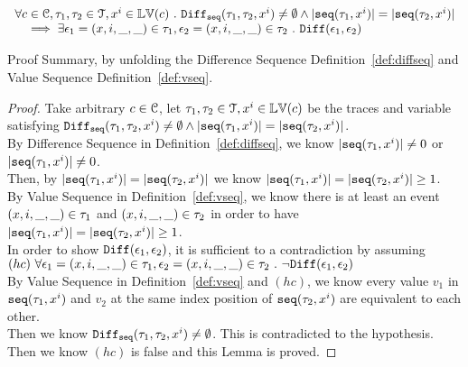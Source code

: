 %
\begin{lem}
	\label{lem:diffval_inv}
\[
	\begin{array}{l}
	\forall c \in \mathcal{C}, \mathtt{\tau}_1, \mathtt{\tau}_2 \in \mathcal{T}, x^i \in \mathbb{LV}(c) ~.~ 
	\mathtt{Diff}_{\mathtt{seq}}(\mathtt{\tau}_1, \mathtt{\tau}_2, x^i) \neq \emptyset \land |\mathtt{seq}(\mathtt{\tau}_1, x^i)| = |\mathtt{seq}(\mathtt{\tau}_2, x^i)|
	\\ \quad \implies
	\exists \mathtt{\epsilon}_1 = (x, i, \_, \_) \in \mathtt{\tau}_1, \mathtt{\epsilon}_2 = (x, i, \_, \_) \in \mathtt{\tau}_2 ~.~ \mathtt{Diff}(\mathtt{\epsilon}_1, \mathtt{\epsilon}_2)
\end{array}
\]
\end{lem}
Proof Summary, by unfolding the Difference Sequence Definition~\ref{def:diffseq} and Value Sequence Definition~\ref{def:vseq}.
\begin{proof}
	Take arbitrary $c \in \mathcal{C}$,
%
let $\mathtt{\tau}_1, \mathtt{\tau}_2 \in \mathcal{T}, x^i\in \mathbb{LV}(c)$ 
be the traces and variable satisfying 
$\mathtt{Diff}_{\mathtt{seq}}(\mathtt{\tau}_1, \mathtt{\tau}_2, x^i) \neq \emptyset \land |\mathtt{seq}(\mathtt{\tau}_1, x^i)| = |\mathtt{seq}(\mathtt{\tau}_2, x^i)|$.
\\
By Difference Sequence in Definition~\ref{def:diffseq}, we know $|\mathtt{seq}(\mathtt{\tau}_1, x^i)| \neq 0$ or $|\mathtt{seq}(\mathtt{\tau}_1, x^i)| \neq 0$.
\\
Then, by $|\mathtt{seq}(\mathtt{\tau}_1, x^i)| = |\mathtt{seq}(\mathtt{\tau}_2, x^i)|$ we know $|\mathtt{seq}(\mathtt{\tau}_1, x^i)| = |\mathtt{seq}(\mathtt{\tau}_2, x^i)| \geq 1$.
\\
By Value Sequence in Definition~\ref{def:vseq}, we know there is at least an event $(x, i, \_, \_) \in \mathtt{\tau}_1$ and 
$(x, i, \_, \_) \in \mathtt{\tau}_2$
in order to have $|\mathtt{seq}(\mathtt{\tau}_1, x^i)| = |\mathtt{seq}(\mathtt{\tau}_2, x^i)| \geq 1$.
\\
In order to show $\mathtt{Diff}(\mathtt{\epsilon}_1, \mathtt{\epsilon}_2)$, it is sufficient to a contradiction 
by assuming 
\\
$(hc)~ \forall \mathtt{\epsilon}_1 = (x, i, \_, \_) \in \mathtt{\tau}_1, \mathtt{\epsilon}_2 = (x, i, \_, \_) \in \mathtt{\tau}_2 ~.~ \neg \mathtt{Diff}(\mathtt{\epsilon}_1, \mathtt{\epsilon}_2)$
\\
By Value Sequence in Definition~\ref{def:vseq} and $(hc)$, we know every value $v_1$ in $\mathtt{seq}(\mathtt{\tau}_1, x^i)$ and $v_2$ at the same
index position of $\mathtt{seq}(\mathtt{\tau}_2, x^i)$
are equivalent to each other.
\\
Then we know $\mathtt{Diff}_{\mathtt{seq}}(\mathtt{\tau}_1, \mathtt{\tau}_2, x^i) \neq \emptyset$. This is contradicted to the hypothesis.
\\
Then we know $(hc)$ is false and this Lemma is proved.
%
\end{proof}

